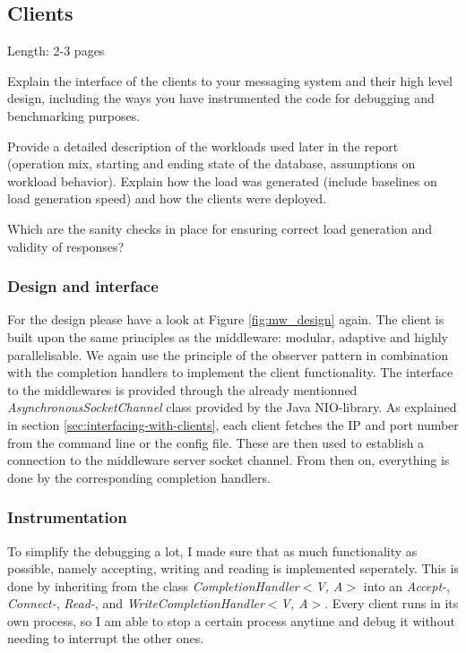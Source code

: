 \documentclass[11pt]{article}
\begin{document}
\subsection{Clients}\label{sec:clients}

Length: 2-3 pages

Explain the interface of the clients to your messaging system and their
high level design, including the ways you have instrumented the code for
debugging and benchmarking purposes.

Provide a detailed description of the workloads used later in the report
(operation mix, starting and ending state of the database, assumptions
on workload behavior). Explain how the load was generated (include
baselines on load generation speed) and how the clients were deployed.

Which are the sanity checks in place for ensuring correct load
generation and validity of responses?

\subsubsection{Design and interface}\label{sec:design-and-interface}
For the design please have a look at Figure \ref{fig:mw_design} again. The client is built upon the same principles as the middleware: modular, adaptive and highly parallelisable. We again use the principle of the observer pattern in combination with the completion handlers to implement the client functionality. The interface to the middlewares is provided through the already mentionned \textit{AsynchronousSocketChannel} class provided by the Java NIO-library. As explained in section \ref{sec:interfacing-with-clients}, each client fetches the IP and port number from the command line or the config file. These are then used to establish a connection to the middleware server socket channel. From then on, everything is done by the corresponding completion handlers.

\subsubsection{Instrumentation}\label{sec:instrumentation}
 To simplify the debugging a lot, I made sure that as much functionality as possible, namely accepting, writing and reading is implemented seperately. This is done by inheriting from the class \textit{CompletionHandler$<$V, A$>$} into an \textit{Accept-}, \textit{Connect-}, \textit{Read-}, and \textit{WriteCompletionHandler$<$V, A$>$}. Every client runs in its own process, so I am able to stop a certain process anytime and debug it without needing to interrupt the other ones.
 
\end{document}
